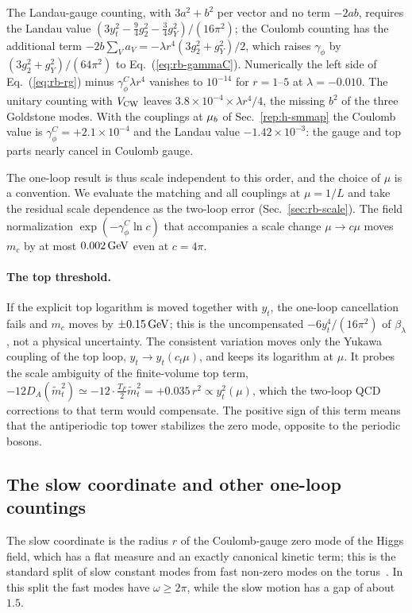 The Landau-gauge counting, with $3a^2+b^2$ per vector and no term $-2ab$, requires the Landau value $(3y_t^2-\frac94g_2^2-\frac34g_Y^2)/(16\pi^2)$; the Coulomb counting has the additional term $-2b\sum_Va_V=-\lambda r^4(3g_2^2+g_Y^2)/2$, which raises $\gamma_\phi$ by $(3g_2^2+g_Y^2)/(64\pi^2)$ to Eq.~(\ref{eq:rb-gammaC}).
Numerically the left side of Eq.~(\ref{eq:rb-rg}) minus $\gamma_\phi^C\lambda r^4$ vanishes to $10^{-14}$ for $r=1$--$5$ at $\lambda=-0.010$. %
The unitary counting with $V_{\rm CW}$ leaves $3.8\times10^{-4}\times\lambda r^4/4$, the missing $b^2$ of the three Goldstone modes. %
With the couplings at $\mu_b$ of Sec.~\ref{rep:h-smmap} the Coulomb value is $\gamma_\phi^C=+2.1\times10^{-4}$ and the Landau value $-1.42\times10^{-3}$: the gauge and top parts nearly cancel in Coulomb gauge. %

The one-loop result is thus scale independent to this order, and the choice of $\mu$ is a convention.
We evaluate the matching and all couplings at $\mu=1/L$ and take the residual scale dependence as the two-loop error (Sec.~\ref{sec:rb-scale}).
The field normalization $\exp(-\gamma_\phi^C\ln c)$ that accompanies a scale change $\mu\to c\mu$ moves $m_c$ by at most $0.002\,\mathrm{GeV}$ even at $c=4\pi$. %

\paragraph{The top threshold.}
If the explicit top logarithm is moved together with $y_t$, the one-loop cancellation fails and $m_c$ moves by $\pm0.15\,\mathrm{GeV}$; this is the uncompensated $-6y_t^4/(16\pi^2)$ of $\beta_\lambda$, not a physical uncertainty. %
The consistent variation moves only the Yukawa coupling of the top loop, $y_t\to y_t(c_t\mu)$, and keeps its logarithm at $\mu$.
It probes the scale ambiguity of the finite-volume top term, $-12D_A(\tilde m_t^2)\simeq-12\cdot\frac{T_F}{2}\tilde m_t^2=+0.035\,r^2\propto y_t^2(\mu)$, which the two-loop QCD corrections to that term would compensate. %
The positive sign of this term means that the antiperiodic top tower stabilizes the zero mode, opposite to the periodic bosons.

\subsection{The slow coordinate and other one-loop countings}
\label{sec:rb-slow}

The slow coordinate is the radius $r$ of the Coulomb-gauge zero mode of the Higgs field, which has a flat measure and an exactly canonical kinetic term; this is the standard split of slow constant modes from fast non-zero modes on the torus~\cite{Luscher:1982ma,Koller:1987fq,vanBaal:2000zc}.
In this split the fast modes have $\omega\ge2\pi$, while the slow motion has a gap of about $1.5$. %

